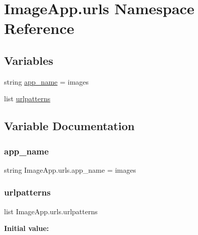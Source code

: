 \hypertarget{namespace_image_app_1_1urls}{}\section{Image\+App.\+urls Namespace Reference}
\label{namespace_image_app_1_1urls}
\subsection*{Variables}
\begin{DoxyCompactItemize}
\item 
string \mbox{\hyperlink{namespace_image_app_1_1urls_a2e1eb9e3694ab644de5fac87d0f11f5c}{app\+\_\+name}} = \textquotesingle{}images\textquotesingle{}
\item 
list \mbox{\hyperlink{namespace_image_app_1_1urls_ac0876244fcb9ae7b2cc6e5ec1d086833}{urlpatterns}}
\end{DoxyCompactItemize}


\subsection{Variable Documentation}
\mbox{\label{namespace_image_app_1_1urls_a2e1eb9e3694ab644de5fac87d0f11f5c}} 
\subsubsection{\texorpdfstring{app\+\_\+name}{app\_name}}
{\footnotesize\ttfamily string Image\+App.\+urls.\+app\+\_\+name = \textquotesingle{}images\textquotesingle{}}

\mbox{\label{namespace_image_app_1_1urls_ac0876244fcb9ae7b2cc6e5ec1d086833}} 
\subsubsection{\texorpdfstring{urlpatterns}{urlpatterns}}
{\footnotesize\ttfamily list Image\+App.\+urls.\+urlpatterns}

{\bfseries Initial value\+:}
